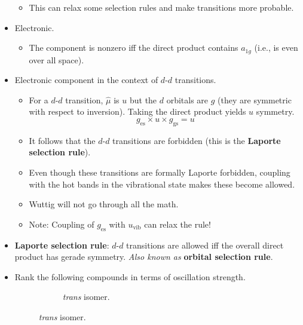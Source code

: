 \documentclass[../notes.tex]{subfiles}
\begin{document}
\begin{itemize}
\begin{itemize}
\begin{itemize}
        \end{itemize}
        \item This can relax some selection rules and make transitions more probable.
    \end{itemize}
    \item Electronic.
    \begin{itemize}
        \item The component is nonzero iff the direct product contains $a_{1g}$ (i.e., is even over all space).
    \end{itemize}
    \item Electronic component in the context of $d$-$d$ transitions.
    \begin{itemize}
        \item For a $d$-$d$ transition, $\hat{\mu}$ is $u$ but the $d$ orbitals are $g$ (they are symmetric with respect to inversion). Taking the direct product yields $u$ symmetry.
        \begin{equation*}
            g_\text{es}\times u\times g_\text{gs} = u
        \end{equation*}
        \item It follows that the $d$-$d$ transitions are forbidden (this is the \textbf{Laporte selection rule}).
        \item Even though these transitions are formally Laporte forbidden, coupling with the hot bands in the vibrational state makes these become allowed.
        \item Wuttig will not go through all the math.
        \item Note: Coupling of $g_\text{es}$ with $u_\text{vib}$ can relax the rule!
    \end{itemize}
    \item \textbf{Laporte selection rule}: $d$-$d$ transitions are allowed iff the overall direct product has gerade symmetry. \emph{Also known as} \textbf{orbital selection rule}.
    \item Rank the following compounds in terms of oscillation strength.
    \begin{figure}[h!]
        \centering
        \footnotesize
        \begin{subfigure}[b]{0.3\linewidth}
            \centering
            \chemleft{[}
            \chemright{]^+}
            \caption{\emph{trans} isomer.}
            \label{fig:oscStrengtha}
        \end{subfigure}

\end{figure}
\end{itemize}
\end{document}
